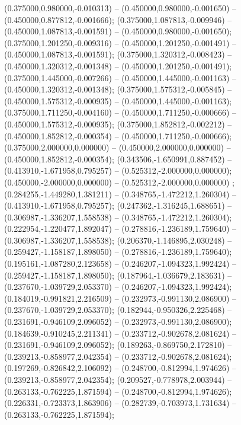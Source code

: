  (0.375000,0.980000,-0.010313) -- (0.450000,0.980000,-0.001650) -- (0.450000,0.877812,-0.001666);
 (0.375000,1.087813,-0.009946) -- (0.450000,1.087813,-0.001591) -- (0.450000,0.980000,-0.001650);
 (0.375000,1.201250,-0.009316) -- (0.450000,1.201250,-0.001491) -- (0.450000,1.087813,-0.001591);
 (0.375000,1.320312,-0.008423) -- (0.450000,1.320312,-0.001348) -- (0.450000,1.201250,-0.001491);
 (0.375000,1.445000,-0.007266) -- (0.450000,1.445000,-0.001163) -- (0.450000,1.320312,-0.001348);
 (0.375000,1.575312,-0.005845) -- (0.450000,1.575312,-0.000935) -- (0.450000,1.445000,-0.001163);
 (0.375000,1.711250,-0.004160) -- (0.450000,1.711250,-0.000666) -- (0.450000,1.575312,-0.000935);
 (0.375000,1.852812,-0.002212) -- (0.450000,1.852812,-0.000354) -- (0.450000,1.711250,-0.000666);
 (0.375000,2.000000,0.000000) -- (0.450000,2.000000,0.000000) -- (0.450000,1.852812,-0.000354);
 (0.343506,-1.650991,0.887452) -- (0.413910,-1.671958,0.795257) -- (0.525312,-2.000000,0.000000);
 (0.450000,-2.000000,0.000000) -- (0.525312,-2.000000,0.000000) ;
 (0.284255,-1.449280,1.381211) -- (0.348765,-1.472212,1.260304) -- (0.413910,-1.671958,0.795257);
 (0.247362,-1.316245,1.688651) -- (0.306987,-1.336207,1.558538) -- (0.348765,-1.472212,1.260304);
 (0.222954,-1.220477,1.892047) -- (0.278816,-1.236189,1.759640) -- (0.306987,-1.336207,1.558538);
 (0.206370,-1.146895,2.030248) -- (0.259427,-1.158187,1.898050) -- (0.278816,-1.236189,1.759640);
 (0.195161,-1.087280,2.123658) -- (0.246207,-1.094323,1.992424) -- (0.259427,-1.158187,1.898050);
 (0.187964,-1.036679,2.183631) -- (0.237670,-1.039729,2.053370) -- (0.246207,-1.094323,1.992424);
 (0.184019,-0.991821,2.216509) -- (0.232973,-0.991130,2.086900) -- (0.237670,-1.039729,2.053370);
 (0.182944,-0.950326,2.225468) -- (0.231691,-0.946109,2.096052) -- (0.232973,-0.991130,2.086900);
 (0.184639,-0.910245,2.211341) -- (0.233712,-0.902678,2.081624) -- (0.231691,-0.946109,2.096052);
 (0.189263,-0.869750,2.172810) -- (0.239213,-0.858977,2.042354) -- (0.233712,-0.902678,2.081624);
 (0.197269,-0.826842,2.106092) -- (0.248700,-0.812994,1.974626) -- (0.239213,-0.858977,2.042354);
 (0.209527,-0.778978,2.003944) -- (0.263133,-0.762225,1.871594) -- (0.248700,-0.812994,1.974626);
 (0.226331,-0.723373,1.863906) -- (0.282739,-0.703973,1.731634) -- (0.263133,-0.762225,1.871594);
